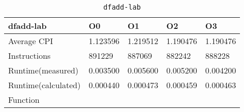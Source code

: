 \begin{table}[ht!]
\centering
\caption{\texttt{dfadd-lab}}
\label{tab:dfadd-lab}
\begin{tabular}{|l|l|l|l|l|}
\hline
\textbf{dfadd-lab}	&	\textbf{O0}	&	\textbf{O1}	&	\textbf{O2}	&	\textbf{O3}	\\\hline\hline
Average CPI	&	1.123596	&	1.219512	&	1.190476	&	1.190476	\\\hline
Instructions	&	891229	&	887069	&	882242	&	888228	\\\hline
Runtime(measured)	&	0.003500	&	0.005600	&	0.005200	&	0.004200	\\\hline
Runtime(calculated)	&	0.000440	&	0.000473	&	0.000459	&	0.000463	\\\hline
Function	&		&		&		&		\\\hline
\end{tabular}
\end{table}
